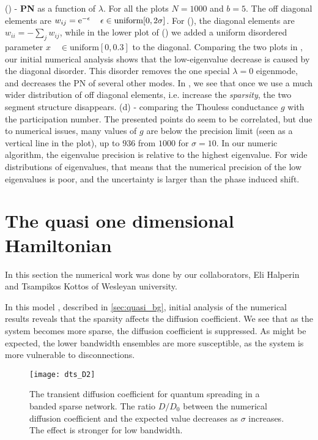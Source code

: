 () - {\bf PN} as a function of $\lambda$.
  For all the plots $N=1000$ and $b=5$. 
  The off diagonal elements are 
  $w_{ij} = \mbox{e}^{-\epsilon} \quad \, \epsilon \in \textrm{uniform} [0,2\sigma]$.
  For (), the diagonal elements are $w_{ii} = -\sum_j w_{ij}$, while in 
  the lower plot of () we added a uniform 
  disordered parameter $x \quad \in \textrm{uniform} [0,0.3]$ to the diagonal.
  Comparing the two plots in , our initial numerical analysis 
  shows that the low-eigenvalue decrease
  is caused by the diagonal disorder. This disorder removes the one special 
  $\lambda=0$ eigenmode, and decreases the PN of several other modes.
  In , we see that once we use a much wider
distribution of off diagonal elements, i.e. increase the \emph{sparsity}, 
the two segment structure disappears.
  (d) - comparing the Thouless conductance $g$ with the participation number. 
  The presented points do seem to be correlated, but due to numerical issues,
  many values of $g$ are below the precision limit (seen as a vertical line in the plot), up to $936$ from $1000$ for $\sigma=10$. In our numeric 
  algorithm, the eigenvalue precision is relative to the highest eigenvalue. For wide distributions
  of eigenvalues, that means that the numerical precision of the low eigenvalues is poor,
  and the uncertainty is larger than the phase induced shift.





\section{The quasi one dimensional Hamiltonian}

In this section the numerical work was done by our collaborators,
Eli Halperin and Tsampikos Kottos of Wesleyan university.

In this model , described in \autoref{sec:quasi_bg}, initial analysis of
the numerical results reveals that the sparsity affects the diffusion coefficient.
We see that as the system becomes more sparse, the diffusion coefficient is suppressed. 
As might be expected, the lower bandwidth ensembles are more
susceptible, as the system is more vulnerable to disconnections.


\begin{figure}
\texttt{[image: dts\_D2]}
\caption{The transient diffusion coefficient for quantum spreading in
a banded sparse network. The ratio $D/D_0$ between the numerical diffusion 
coefficient and the expected value decreases as $\sigma$ increases. The effect
is stronger for low bandwidth.}
\end{figure}


